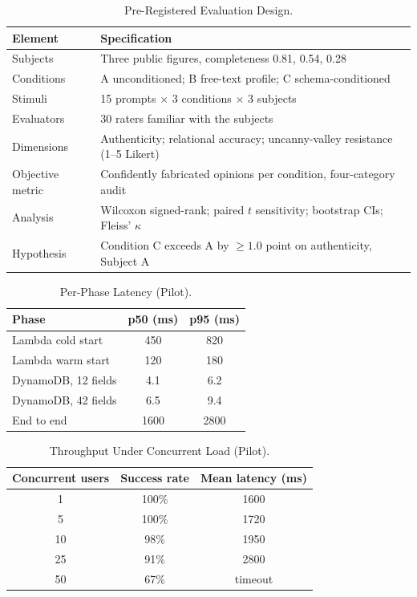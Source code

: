 \documentclass[journal]{IEEEtran}
\begin{document}
\begin{table}[htbp]
\caption{Pre-Registered Evaluation Design.}
\label{tab:eval_design}
\centering
\begin{tabular}{lp{5.8cm}}
\toprule
\textbf{Element} & \textbf{Specification} \\
\midrule
Subjects          & Three public figures, completeness 0.81, 0.54, 0.28 \\
Conditions        & A unconditioned; B free-text profile; C schema-conditioned \\
Stimuli           & 15 prompts $\times$ 3 conditions $\times$ 3 subjects \\
Evaluators        & 30 raters familiar with the subjects \\
Dimensions        & Authenticity; relational accuracy; uncanny-valley resistance (1--5 Likert) \\
Objective metric  & Confidently fabricated opinions per condition, four-category audit \\
Analysis          & Wilcoxon signed-rank; paired $t$ sensitivity; bootstrap CIs; Fleiss' $\kappa$ \\
Hypothesis        & Condition C exceeds A by $\ge 1.0$ point on authenticity, Subject A \\
\bottomrule
\end{tabular}
\end{table}


\begin{table}[htbp]
\caption{Per-Phase Latency (Pilot).}
\label{tab:latency}
\centering
\begin{tabular}{lcc}
\toprule
\textbf{Phase} & \textbf{p50 (ms)} & \textbf{p95 (ms)} \\
\midrule
Lambda cold start       & 450 & 820 \\
Lambda warm start       & 120 & 180 \\
DynamoDB, 12 fields     & 4.1 & 6.2 \\
DynamoDB, 42 fields     & 6.5 & 9.4 \\
End to end              & 1600 & 2800 \\
\bottomrule
\end{tabular}
\end{table}


\begin{table}[htbp]
\caption{Throughput Under Concurrent Load (Pilot).}
\label{tab:throughput}
\centering
\begin{tabular}{ccc}
\toprule
\textbf{Concurrent users} & \textbf{Success rate} & \textbf{Mean latency (ms)} \\
\midrule
1   & 100\% & 1600 \\
5   & 100\% & 1720 \\
10  & 98\%  & 1950 \\
25  & 91\%  & 2800 \\
50  & 67\%  & timeout \\
\bottomrule
\end{tabular}
\end{table}
\end{document}

